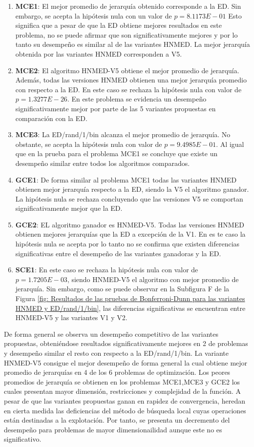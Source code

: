 \begin{enumerate}
	\item \textbf{MCE1}: El mejor promedio de jerarquía obtenido corresponde a la ED. Sin embargo, se acepta la hipótesis nula con un valor de $p=8.1173E-01$ Esto significa que a pesar de que la ED obtiene mejores resultados en este problema,  no se puede afirmar que son significativamente mejores y por lo tanto su desempeño es similar al de las variantes HNMED. La mejor jerarquía obtenida por las variantes HNMED corresponden a V5.
	\item \textbf{MCE2}: El algoritmo HNMED-V5  obtiene el mejor promedio de jerarquía. Además, todas las versiones HNMED obtienen una mejor jerarquía promedio con respecto a la ED. En este caso se rechaza la hipótesis nula con valor de $p=1.3277E-26$. En este problema se evidencia un desempeño significativamente mejor por parte de las 5 variantes propuestas en comparación con la ED.
	\item \textbf{MCE3}: La ED/rand/1/bin alcanza el mejor promedio de jerarquía. No obstante, se acepta la hipótesis nula con valor de $p=9.4985E-01$. Al igual que en la prueba para el problema MCE1 se concluye que existe un desempeño similar entre todos los algoritmos comparados.
	\item \textbf{GCE1}: De forma similar al problema MCE1 todas las variantes HNMED obtienen mejor jerarquía respecto a la ED, siendo la V5 el algoritmo ganador. La hipótesis nula se rechaza concluyendo que las versiones V5 se comportan significativamente mejor que la ED.
	\item \textbf{GCE2}: EL algoritmo ganador es HNMED-V5. Todas las versiones HNMED obtienen mejores jerarquías que la ED  a excepción de la V1. En es te caso la hipótesis nula se acepta por lo tanto no se confirma que existen diferencias significativas entre el desempeño de las variantes ganadoras y la ED. 
	\item \textbf{SCE1}: En este caso se rechaza la hipótesis nula con valor de $p=1.7205E-03$, siendo HNMED-V5 el algoritmo con mejor promedio de jerarquía. Sin embargo, como se puede observar en la Subfigura F de la Figura \ref{fig: Resultados de las pruebas de Bonferroni-Dunn  para las variantes HNMED y ED/rand/1/bin}, las diferencias significativas se encuentran entre HNMED-V5 y las variantes V1 y V2.   
\end{enumerate}
De forma general se observa un desempeño competitivo de las variantes propuestas, obteniéndose resultados significativamente mejores en 2 de problemas y desempeño similar el resto con respecto a la ED/rand/1/bin. La variante HNMED-V5 consigue el mejor desempeño de forma general la cual obtiene mejor promedio de jerarquías en 4 de los 6 problemas de optimización. Los peores promedios de jerarquía se obtienen en los problemas MCE1,MCE3 y GCE2 los cuales presentan mayor dimensión, restricciones y complejidad de la función. A pesar de que las variantes propuestas ganan en rapidez de convergencia, heredan en cierta medida las deficiencias del método de búsqueda local cuyas operaciones están destinadas a la explotación. Por tanto, se presenta un decremento del desempeño para problemas de mayor dimensionailidad  aunque este no es significativo.



